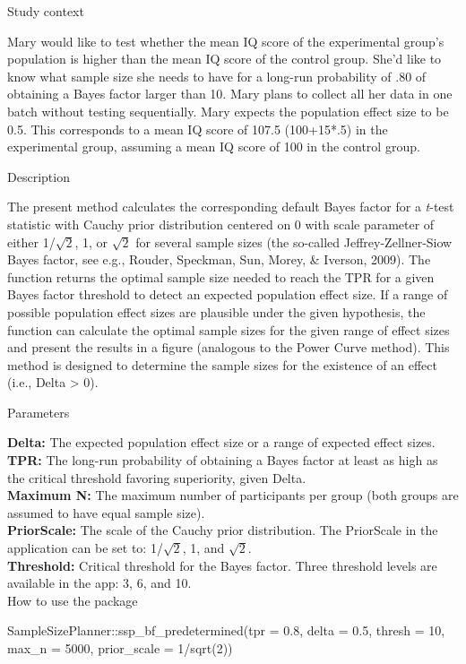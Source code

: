 \documentclass[
  english,
  man,floatsintext]{apa6}
\newenvironment{Shaded}{\begin{snugshade}}{\end{snugshade}}
\newcommand{\AttributeTok}[1]{\textcolor[rgb]{0.77,0.63,0.00}{#1}}
\newcommand{\DecValTok}[1]{\textcolor[rgb]{0.00,0.00,0.81}{#1}}
\newcommand{\FloatTok}[1]{\textcolor[rgb]{0.00,0.00,0.81}{#1}}
\newcommand{\FunctionTok}[1]{\textcolor[rgb]{0.00,0.00,0.00}{#1}}
\newcommand{\NormalTok}[1]{#1}
\newcommand{\SpecialCharTok}[1]{\textcolor[rgb]{0.00,0.00,0.00}{#1}}
\begin{document}
Study context

Mary would like to test whether the mean IQ score of the experimental group's population is higher than the mean IQ score of the control group. She'd like to know what sample size she needs to have for a long-run probability of .80 of obtaining a Bayes factor larger than 10. Mary plans to collect all her data in one batch without testing sequentially. Mary expects the population effect size to be 0.5. This corresponds to a mean IQ score of 107.5 (100+15*.5) in the experimental group, assuming a mean IQ score of 100 in the control group.

Description

The present method calculates the corresponding default Bayes factor for a \emph{t}-test statistic with Cauchy prior distribution centered on 0 with scale parameter of either 1/\(\sqrt{2}\), 1, or \(\sqrt{2}\) for several sample sizes (the so-called Jeffrey-Zellner-Siow Bayes factor, see e.g., Rouder, Speckman, Sun, Morey, \& Iverson, 2009). The function returns the optimal sample size needed to reach the TPR for a given Bayes factor threshold to detect an expected population effect size. If a range of possible population effect sizes are plausible under the given hypothesis, the function can calculate the optimal sample sizes for the given range of effect sizes and present the results in a figure (analogous to the Power Curve method). This method is designed to determine the sample sizes for the existence of an effect (i.e., Delta \textgreater{} 0).

Parameters

\textbf{Delta:} The expected population effect size or a range of expected effect sizes.\\
\textbf{TPR:} The long-run probability of obtaining a Bayes factor at least as high as the critical threshold favoring superiority, given Delta.\\
\textbf{Maximum N:} The maximum number of participants per group (both groups are assumed to have equal sample size).\\
\textbf{PriorScale:} The scale of the Cauchy prior distribution. The PriorScale in the application can be set to: 1/\(\sqrt{2}\), 1, and \(\sqrt{2}\).\\
\textbf{Threshold:} Critical threshold for the Bayes factor. Three threshold levels are available in the app: 3, 6, and 10.\\

How to use the package

\begin{Shaded}
\begin{Highlighting}[]
\NormalTok{SampleSizePlanner}\SpecialCharTok{::}\FunctionTok{ssp\_bf\_predetermined}\NormalTok{(}\AttributeTok{tpr =} \FloatTok{0.8}\NormalTok{, }\AttributeTok{delta =} \FloatTok{0.5}\NormalTok{,}
    \AttributeTok{thresh =} \DecValTok{10}\NormalTok{, }\AttributeTok{max\_n =} \DecValTok{5000}\NormalTok{, }\AttributeTok{prior\_scale =} \DecValTok{1}\SpecialCharTok{/}\FunctionTok{sqrt}\NormalTok{(}\DecValTok{2}\NormalTok{))}
\end{Highlighting}
\end{Shaded}
\end{document}
